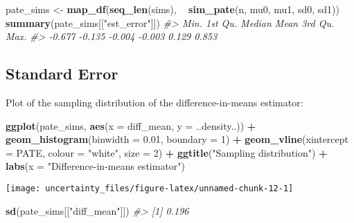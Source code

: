 \documentclass[]{book}
\newenvironment{Shaded}{\begin{snugshade}}{\end{snugshade}}
\newcommand{\KeywordTok}[1]{\textcolor[rgb]{0.13,0.29,0.53}{\textbf{#1}}}
\newcommand{\DataTypeTok}[1]{\textcolor[rgb]{0.13,0.29,0.53}{#1}}
\newcommand{\DecValTok}[1]{\textcolor[rgb]{0.00,0.00,0.81}{#1}}
\newcommand{\FloatTok}[1]{\textcolor[rgb]{0.00,0.00,0.81}{#1}}
\newcommand{\StringTok}[1]{\textcolor[rgb]{0.31,0.60,0.02}{#1}}
\newcommand{\CommentTok}[1]{\textcolor[rgb]{0.56,0.35,0.01}{\textit{#1}}}
\newcommand{\OperatorTok}[1]{\textcolor[rgb]{0.81,0.36,0.00}{\textbf{#1}}}
\newcommand{\NormalTok}[1]{#1}
\theoremstyle{definition}
\theoremstyle{definition}
\theoremstyle{definition}
\theoremstyle{remark}
\begin{document}
\begin{Shaded}
\begin{Highlighting}[]
\NormalTok{pate_sims <-}
\StringTok{  }\KeywordTok{map_df}\NormalTok{(}\KeywordTok{seq_len}\NormalTok{(sims), }\OperatorTok{~}\StringTok{ }\KeywordTok{sim_pate}\NormalTok{(n, mu0, mu1, sd0, sd1))}
\KeywordTok{summary}\NormalTok{(pate_sims[[}\StringTok{"est_error"}\NormalTok{]])}
\CommentTok{#>    Min. 1st Qu.  Median    Mean 3rd Qu.    Max. }
\CommentTok{#>  -0.677  -0.135  -0.004  -0.003   0.129   0.853}
\end{Highlighting}
\end{Shaded}

\subsection{Standard Error}\label{standard-error}

Plot of the sampling distribution of the difference-in-means estimator:

\begin{Shaded}
\begin{Highlighting}[]
\KeywordTok{ggplot}\NormalTok{(pate_sims, }\KeywordTok{aes}\NormalTok{(}\DataTypeTok{x =}\NormalTok{ diff_mean, }\DataTypeTok{y =}\NormalTok{ ..density..)) }\OperatorTok{+}
\StringTok{  }\KeywordTok{geom_histogram}\NormalTok{(}\DataTypeTok{binwidth =} \FloatTok{0.01}\NormalTok{, }\DataTypeTok{boundary =} \DecValTok{1}\NormalTok{) }\OperatorTok{+}
\StringTok{  }\KeywordTok{geom_vline}\NormalTok{(}\DataTypeTok{xintercept =}\NormalTok{ PATE, }\DataTypeTok{colour =} \StringTok{"white"}\NormalTok{, }\DataTypeTok{size =} \DecValTok{2}\NormalTok{) }\OperatorTok{+}
\StringTok{  }\KeywordTok{ggtitle}\NormalTok{(}\StringTok{"Sampling distribution"}\NormalTok{) }\OperatorTok{+}
\StringTok{  }\KeywordTok{labs}\NormalTok{(}\DataTypeTok{x =} \StringTok{"Difference-in-means estimator"}\NormalTok{)}
\end{Highlighting}
\end{Shaded}

\begin{center}\texttt{[image: uncertainty\_files/figure-latex/unnamed-chunk-12-1]} \end{center}

\begin{Shaded}
\begin{Highlighting}[]
\KeywordTok{sd}\NormalTok{(pate_sims[[}\StringTok{"diff_mean"}\NormalTok{]])}
\CommentTok{#> [1] 0.196}
\end{Highlighting}
\end{Shaded}
\end{document}
